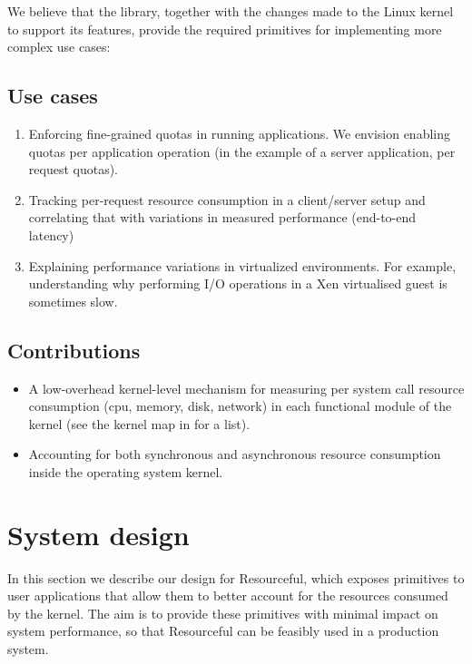 \documentclass[12pt]{article}
\begin{document}
We believe that the library, together with the changes made to the Linux kernel to support its features, provide the required primitives for implementing more complex use cases:

\subsection{Use cases}
\begin{enumerate}
\item Enforcing fine-grained quotas in running applications. We envision enabling quotas per application operation (in the example of a server application, per request quotas).
\item Tracking per-request resource consumption in a client/server setup and correlating that with variations in measured performance (end-to-end latency)
\item Explaining performance variations in virtualized environments. For example, understanding why performing I/O operations in a Xen virtualised guest is sometimes slow.
\end{enumerate}


\subsection{Contributions}
\begin{itemize}
\item A low-overhead kernel-level mechanism for measuring per system call resource consumption (cpu, memory, disk, network) in each functional module of the kernel (see the kernel map in \cite{kernelmap} for a list).
\item Accounting for both synchronous and asynchronous resource consumption inside the operating system kernel.
\end{itemize}


\section{System design}
In this section we describe our design for Resourceful, which exposes primitives to user applications that allow them to better account for the resources consumed by the kernel. 
The aim is to provide these primitives with minimal impact on system performance, so that Resourceful can be feasibly used in a production system.
\end{document}

